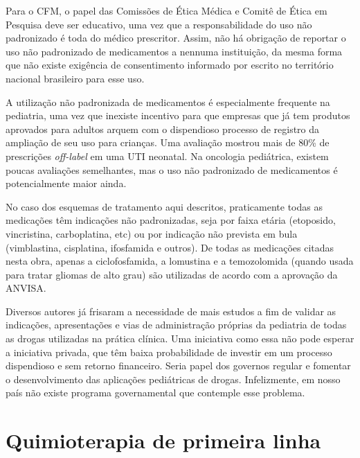 \documentclass[11pt,a4paper,oldfontcommands]{memoir}
\begin{document}
Para o CFM, o papel das Comissões de Ética Médica e Comitê de Ética em Pesquisa deve ser educativo, uma vez que a responsabilidade do uso não padronizado é toda do médico prescritor. Assim, não há obrigação de reportar o uso não padronizado de medicamentos a nennuma instituição, da mesma forma que não existe exigência de consentimento informado por escrito no território nacional brasileiro para esse uso.

A utilização não padronizada de medicamentos é especialmente frequente na pediatria, uma vez que inexiste incentivo para que empresas que já tem produtos aprovados para adultos arquem com o dispendioso processo de registro da ampliação de seu uso para crianças. \cite{10.1001/archpedi.161.3.282} Uma avaliação mostrou mais de 80\% de prescrições \textit{off-label} em uma UTI neonatal. \cite{CARVALHO2012} Na oncologia pediátrica, existem poucas avaliações semelhantes, mas o uso não padronizado de medicamentos é potencialmente maior ainda. \cite{pmid21453298,10.1111/jcpt.12507}

No caso dos esquemas de tratamento aqui descritos, praticamente todas as medicações têm indicações não padronizadas, seja por faixa etária (etoposido, vincristina, carboplatina, etc) ou por indicação não prevista em bula (vimblastina, cisplatina, ifosfamida e outros). De todas as medicações citadas nesta obra, apenas a ciclofosfamida, a lomustina e a temozolomida (quando usada para tratar gliomas de alto grau) são utilizadas de acordo com a aprovação da ANVISA.

Diversos autores já frisaram a necessidade de mais estudos a fim de validar as indicações, apresentações e vias de administração próprias da pediatria de todas as drogas utilizadas na prática clínica. Uma iniciativa como essa não pode esperar a iniciativa privada, que têm baixa probabilidade de investir em um processo dispendioso e sem retorno financeiro. Seria papel dos governos regular e fomentar o desenvolvimento das aplicações pediátricas de drogas. Infelizmente, em nosso país não existe programa governamental que contemple esse problema.



\cleardoublepage

\appendix
\chapter{Quimioterapia de primeira linha}
\cleardoublepage
\end{document}
